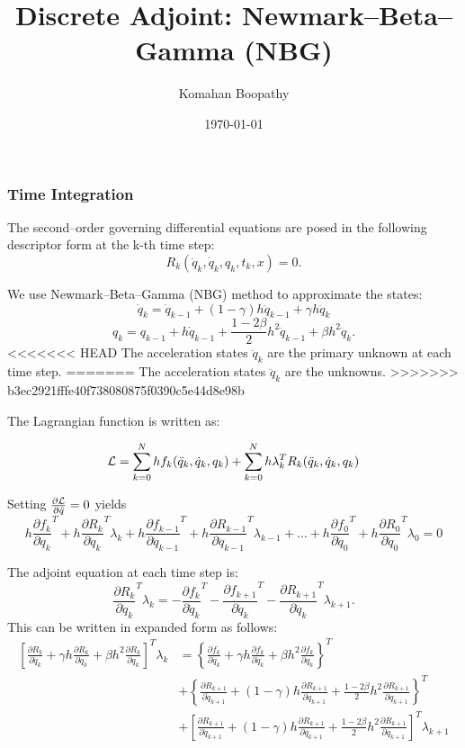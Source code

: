 \documentclass{beamer}
\title[\hspace{-0.2cm} DIRK Adjoint]
{
Discrete Adjoint: Newmark--Beta--Gamma (NBG)
}
\author[Komahan Boopathy]
{
  \Large {Komahan Boopathy}\\
}
\institute
{
  \large Georgia Institute of Technology\\
 School of Aerospace Engineering\\
 Atlanta, GA
}
\date
{
\small \today
}
\newcommand{\pd}[2]{\frac{\partial #1}{\partial #2}}
\begin{document}
\begin{frame}
  \titlepage
\end{frame}


\begin{frame}[allowframebreaks] \frametitle{Time Integration}

  The second--order governing differential equations are posed in the following
  descriptor form at the k-th time step:
  $$ R_k(\ddot{q}_k, \dot{q}_k, q_k, t_k , x) = 0.$$

  We use Newmark--Beta--Gamma (NBG) method to approximate the states:
  $$ \dot{q}_k  = \dot{q}_{k-1}  + (1-\gamma) h \ddot{q}_{k-1} +  \gamma h \ddot{q}_{k}$$ 
  $$ {q}_k      =     {q}_{k-1}  + h \dot{q}_{k-1} +\frac{1-2\beta}{2} h^2\ddot{q}_{k-1}+ \beta h^2 \ddot{q}_k.$$
<<<<<<< HEAD
  The acceleration states $\ddot{q}_k$ are the primary unknown at each time step.
=======
  The acceleration states $\ddot{q}_k$ are the unknowns.
>>>>>>> b3ec2921fffe40f738080875f0390c5e44d8e98b
  
  \framebreak

  The Lagrangian function is written as:

  $${\cal{L}} = \sum_{k=0}^N h f_k(\ddot{q}_k, \dot{q}_k, q_k) + \sum_{k=0}^N h  \lambda_k^T R_k(\ddot{q}_k, \dot{q}_k, q_k) $$

  Setting $\pd{\cal{L}}{\ddot{q}} = 0$ yields
  \small{
  $$ h\pd{f_k}{\ddot{q}_k}^T + h \pd{R_k}{\ddot{q}_k}^T \lambda_k
  + h\pd{f_{k-1}}{\ddot{q}_{k-1}}^T +  h \pd{R_{k-1}}{\ddot{q}_{k-1}}^T \lambda_{k-1} + \ldots + 
  h\pd{f_0}{\ddot{q}_0}^T + h \pd{R_0}{\ddot{q}_0}^T \lambda_0
  = 0 $$
  }

  The adjoint equation at each time step is:
  $$\pd{R_k}{\ddot{q}_k}^T \lambda_k = - \pd{f_k}{\ddot{q}_k}^T  - \pd{f_{k+1}}{\ddot{q}_{k}}^T - \pd{R_{k+1}}{\ddot{q}_{k}}^T \lambda_{k+1}.$$
  This can be written in expanded form as follows:
  \scriptsize{
  \begin{equation}\nonumber\begin{split}
    \left[ \pd{R_k}{\ddot{q}_k} + \gamma h \pd{R_k}{\dot{q}_k} + \beta h^2 \pd{R_k}{{q}_k} \right]^T \lambda_k & = \left\{ \pd{f_k}{\ddot{q}_k} + \gamma h \pd{f_k}{\dot{q}_k} + \beta h^2 \pd{f_k}{{q}_k} \right\}^T \\ & +  \left\{ \pd{R_{k+1}}{\ddot{q}_{k+1}} + (1-\gamma) h \pd{R_{k+1}}{\dot{q}_{k+1}} + \frac{1-2\beta}{2} h^2 \pd{R_{k+1}}{{q}_{k+1}} \right\}^T \\
    & +  \left[ \pd{R_{k+1}}{\ddot{q}_{k+1}} + (1-\gamma) h \pd{R_{k+1}}{\dot{q}_{k+1}} + \frac{1-2\beta}{2} h^2 \pd{R_{k+1}}{{q}_{k+1}} \right]^T\lambda_{k+1} \\
      \end{split}
  \end{equation}
  }
  
\end{frame}
\end{document}
